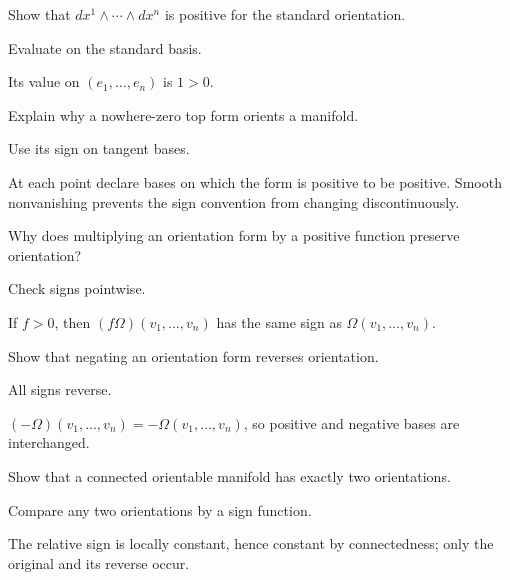 \begin{exercise}\label{exr:vii10-07}
Show that $dx^1\wedge\cdots\wedge dx^n$ is positive for the standard orientation.
\end{exercise}
\begin{hint}
Evaluate on the standard basis.
\end{hint}
\begin{solution}
Its value on $(e_1,\ldots,e_n)$ is $1>0$.
\end{solution}

\begin{exercise}\label{exr:vii10-08}
Explain why a nowhere-zero top form orients a manifold.
\end{exercise}
\begin{hint}
Use its sign on tangent bases.
\end{hint}
\begin{solution}
At each point declare bases on which the form is positive to be positive. Smooth nonvanishing prevents the sign convention from changing discontinuously.
\end{solution}

\begin{exercise}\label{exr:vii10-09}
Why does multiplying an orientation form by a positive function preserve orientation?
\end{exercise}
\begin{hint}
Check signs pointwise.
\end{hint}
\begin{solution}
If $f>0$, then $(f\Omega)(v_1,\dots,v_n)$ has the same sign as $\Omega(v_1,\dots,v_n)$.
\end{solution}

\begin{exercise}\label{exr:vii10-10}
Show that negating an orientation form reverses orientation.
\end{exercise}
\begin{hint}
All signs reverse.
\end{hint}
\begin{solution}
$(-\Omega)(v_1,\dots,v_n)=-\Omega(v_1,\dots,v_n)$, so positive and negative bases are interchanged.
\end{solution}

\begin{exercise}\label{exr:vii10-11}
Show that a connected orientable manifold has exactly two orientations.
\end{exercise}
\begin{hint}
Compare any two orientations by a sign function.
\end{hint}
\begin{solution}
The relative sign is locally constant, hence constant by connectedness; only the original and its reverse occur.
\end{solution}


